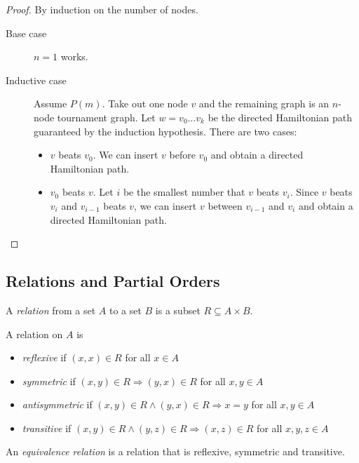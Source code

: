 \documentclass[11pt]{article}
\begin{document}
\begin{proof}
By induction on the number of nodes.

\begin{description}
\item[Base case] $n=1$ works.
\item[Inductive case] Assume $P(m)$. Take out one node $v$ and the remaining graph is an
$n$-node tournament graph. Let $w=v_0 \dots v_k$ be the directed Hamiltonian path guaranteed by the
induction hypothesis. There are two cases:
\begin{itemize}
\item $v$ beats $v_0$. We can insert $v$ before $v_0$ and obtain a directed Hamiltonian path.
\item $v_0$ beats $v$. Let $i$ be the smallest number that $v$ beats $v_i$. Since $v$ beats $v_i$
and $v_{i-1}$ beats $v$, we can insert $v$ between $v_{i-1}$ and $v_i$ and obtain a directed
Hamiltonian path.
\end{itemize}
\end{description}
\end{proof}

\subsection{Relations and Partial Orders}

\begin{definition}
A \emph{relation} from a set $A$ to a set $B$ is a subset $R \subseteq A \times B$.
\end{definition}

\begin{definition}
A relation on $A$ is
\begin{itemize}
\item \emph{reflexive} if $(x,x) \in R$ for all $x \in A$
\item \emph{symmetric} if $(x,y) \in R \Rightarrow (y,x) \in R$ for all $x,y \in A$
\item \emph{antisymmetric} if $(x,y) \in R \wedge (y,x) \in R \Rightarrow x = y$ for all
$x,y \in A$
\item \emph{transitive} if $(x,y) \in R \wedge (y,z) \in R \Rightarrow (x,z) \in R$ for all
$x,y,z \in A$
\end{itemize}
\end{definition}

\begin{definition}
An \emph{equivalence relation} is a relation that is reflexive, symmetric and transitive.
\end{definition}
\end{document}
